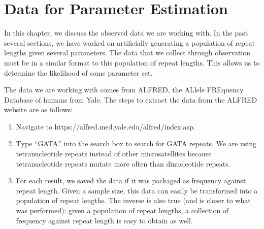 \chapter{Data for Parameter Estimation}\label{ch:dataForParameterEstimation}
In this chapter, we discuss the observed data we are working with.
In the past several sections, we have worked on artificially generating a population of repeat lengths given several
parameters.
The data that we collect through observation must be in a similar format to this population of repeat lengths.
This allows us to determine the likelihood of some parameter set.

The data we are working with comes from ALFRED, the ALlele FREquency Database of humans from Yale.
The steps to extract the data from the ALFRED website are as follows:
\begin{enumerate}
    \item Navigate to https://alfred.med.yale.edu/alfred/index.asp.
    \item Type ``GATA'' into the search box to search for GATA repeats.
        We are using tetranucleotide repeats instead of other microsatellites because tetranucleotide repeats mutate
        more often than dinucleotide repeats.
    \item For each result, we saved the data if it was packaged as frequency against repeat length.
        Given a sample size, this data can easily be transformed into a population of repeat lengths.
        The inverse is also true (and is closer to what was performed): given a population of repeat lengths,
        a collection of frequency against repeat length is easy to obtain as well.
\end{enumerate}
